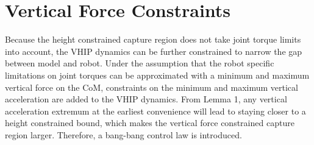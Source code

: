 \section{Vertical Force Constraints}\label{sec:verticalforce}
Because the height constrained capture region does not take joint torque limits into account, the \ac{VHIP} dynamics can be further constrained to narrow the gap between model and robot. Under the assumption that the robot specific limitations on joint torques can be approximated with a minimum and maximum vertical force on the \ac{CoM}, constraints on the minimum and maximum vertical acceleration are added to the \ac{VHIP} dynamics. From Lemma 1, any vertical acceleration extremum at the earliest convenience will lead to staying closer to a height constrained bound, which makes the vertical force constrained capture region larger. Therefore, a bang-bang control law is introduced.
     
